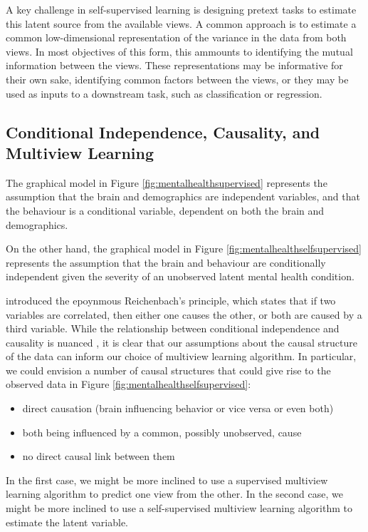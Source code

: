 A key challenge in self-supervised learning is designing pretext tasks to estimate this latent source from the available views.
A common approach is to estimate a common low-dimensional representation of the variance in the data from both \gls{views}.
In most objectives of this form, this ammounts to identifying the mutual information between the \gls{views}.
These \gls{representations} may be informative for their own sake, identifying common factors between the \gls{views}, or they may be used as inputs to a downstream task, such as classification or regression.

\subsection{Conditional Independence, Causality, and Multiview Learning}

The graphical model in Figure \ref{fig:mentalhealthsupervised} represents the assumption that the brain and demographics are independent variables, and that the behaviour is a conditional variable, dependent on both the brain and demographics.

On the other hand, the graphical model in Figure \ref{fig:mentalhealthselfsupervised} represents the assumption that the brain and behaviour are conditionally independent given the severity of an unobserved latent mental health condition.

\citet{reichenbach1956direction} introduced the epoynmous Reichenbach's principle, which states that if two variables are correlated, then either one causes the other, or both are caused by a third variable.
While the relationship between conditional independence and causality is nuanced \citep{pearl2009causality}, it is clear that our assumptions about the causal structure of the data can inform our choice of multiview learning algorithm.
In particular, we could envision a number of causal structures that could give rise to the observed data in Figure \ref{fig:mentalhealthselfsupervised}:

\begin{itemize}
    \item direct causation (brain influencing behavior or vice versa or even both)
    \item both being influenced by a common, possibly unobserved, cause
    \item no direct causal link between them
\end{itemize}

In the first case, we might be more inclined to use a supervised multiview learning algorithm to predict one view from the other.
In the second case, we might be more inclined to use a self-supervised multiview learning algorithm to estimate the latent variable.

